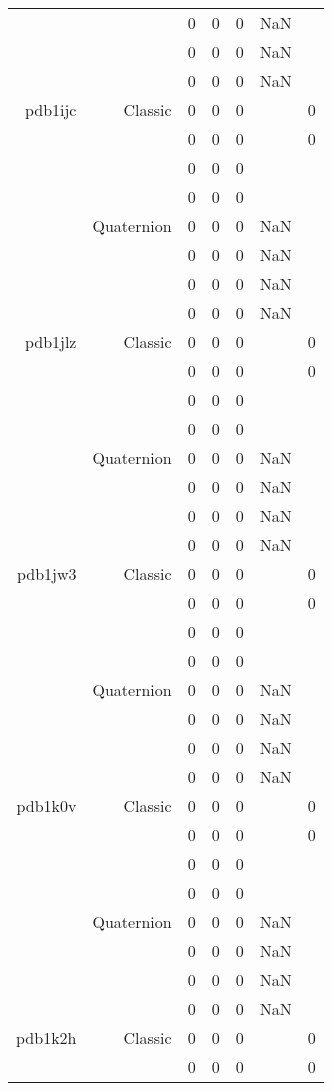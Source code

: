 \begin{xltabular}{\textwidth}{r|rcccSc}
& & 0 & 0 & 0 & NaN & \\
& & 0 & 0 & 0 & NaN & \\
& & 0 & 0 & 0 & NaN & \\ \addlinespace
pdb1ijc & Classic & 0 & 0 & 0 & & 0 \\
& & 0 & 0 & 0 & & 0 \\
& & 0 & 0 & 0 & & \\
& & 0 & 0 & 0 & & \\
& Quaternion & 0 & 0 & 0 & NaN & \\
& & 0 & 0 & 0 & NaN & \\
& & 0 & 0 & 0 & NaN & \\
& & 0 & 0 & 0 & NaN & \\ \addlinespace
pdb1jlz & Classic & 0 & 0 & 0 & & 0 \\
& & 0 & 0 & 0 & & 0 \\
& & 0 & 0 & 0 & & \\
& & 0 & 0 & 0 & & \\
& Quaternion & 0 & 0 & 0 & NaN & \\
& & 0 & 0 & 0 & NaN & \\
& & 0 & 0 & 0 & NaN & \\
& & 0 & 0 & 0 & NaN & \\ \addlinespace
pdb1jw3 & Classic & 0 & 0 & 0 & & 0 \\
& & 0 & 0 & 0 & & 0 \\
& & 0 & 0 & 0 & & \\
& & 0 & 0 & 0 & & \\
& Quaternion & 0 & 0 & 0 & NaN & \\
& & 0 & 0 & 0 & NaN & \\
& & 0 & 0 & 0 & NaN & \\
& & 0 & 0 & 0 & NaN & \\ \addlinespace
pdb1k0v & Classic & 0 & 0 & 0 & & 0 \\
& & 0 & 0 & 0 & & 0 \\
& & 0 & 0 & 0 & & \\
& & 0 & 0 & 0 & & \\
& Quaternion & 0 & 0 & 0 & NaN & \\
& & 0 & 0 & 0 & NaN & \\
& & 0 & 0 & 0 & NaN & \\
& & 0 & 0 & 0 & NaN & \\ \addlinespace
pdb1k2h & Classic & 0 & 0 & 0 & & 0 \\
& & 0 & 0 & 0 & & 0 \\

\end{xltabular}
